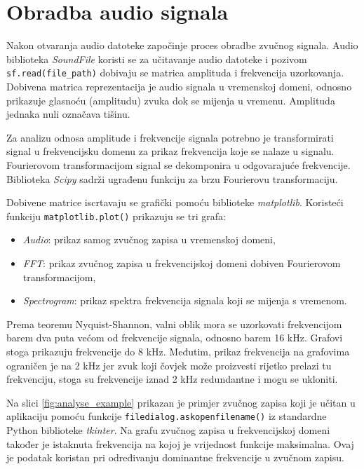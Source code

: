\chapter{Obradba audio signala}

Nakon otvaranja audio datoteke započinje proces obradbe zvučnog signala. Audio biblioteka \textit{SoundFile} koristi se za učitavanje audio datoteke i pozivom \lstinline|sf.read(file_path)| dobivaju se matrica amplituda i frekvencija uzorkovanja. Dobivena matrica reprezentacija je audio signala u vremenskoj domeni, odnosno prikazuje glasnoću (amplitudu) zvuka dok se mijenja u vremenu. Amplituda jednaka nuli označava tišinu.

Za analizu odnosa amplitude i frekvencije signala potrebno je transformirati signal u frekvencijsku domenu za prikaz frekvencija koje se nalaze u signalu. Fourierovom transformacijom signal se dekomponira u odgovarajuće frekvencije. Biblioteka \textit{Scipy} sadrži ugrađenu funkciju za brzu Fourierovu transformaciju. 

Dobivene matrice iscrtavaju se grafički pomoću biblioteke \textit{matplotlib}. Koristeći funkciju \lstinline|matplotlib.plot()| prikazuju se tri grafa:
\begin{itemize}
	\item \textit{Audio}: prikaz samog zvučnog zapisa u vremenskoj domeni,
	\item \textit{FFT}: prikaz zvučnog zapisa u frekvencijskoj domeni dobiven Fourierovom transformacijom,
	\item \textit{Spectrogram}: prikaz spektra frekvencija signala koji se mijenja s vremenom.
\end{itemize}

Prema teoremu Nyquist-Shannon, valni oblik mora se uzorkovati frekvencijom barem dva puta većom od frekvencije signala, odnosno barem 16 kHz. Grafovi stoga prikazuju frekvencije do 8 kHz. Međutim, prikaz frekvencija na grafovima ograničen je na 2 kHz jer zvuk koji čovjek može proizvesti rijetko prelazi tu frekvenciju, stoga su frekvencije iznad 2 kHz redundantne i mogu se ukloniti. 

Na slici \ref{fig:analyse_example} prikazan je primjer zvučnog zapisa koji je učitan u aplikaciju pomoću funkcije \lstinline|filedialog.askopenfilename()| iz standardne Python biblioteke \textit{tkinter}. Na grafu zvučnog zapisa u frekvencijskoj domeni također je istaknuta frekvencija na kojoj je vrijednost funkcije maksimalna. Ovaj je podatak koristan pri određivanju dominantne frekvencije u zvučnom zapisu. 


